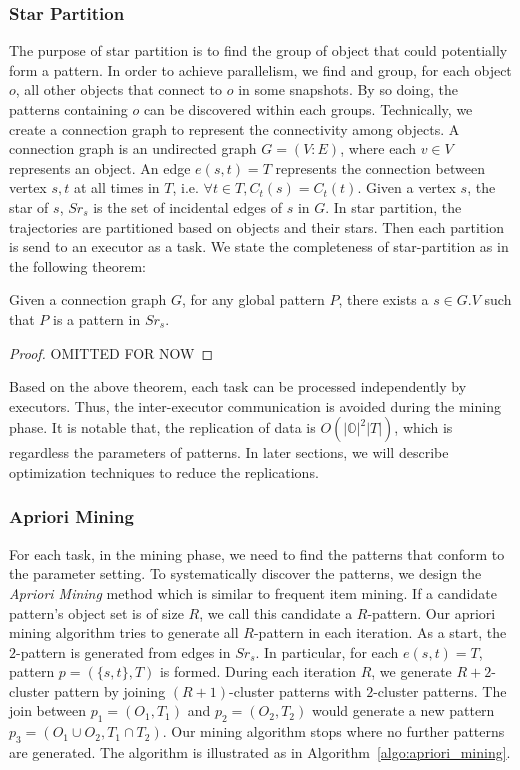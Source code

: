 \subsubsection{Star Partition}
The purpose of star partition is to find the group of object that 
could potentially form a pattern. In order to achieve parallelism, 
we find and group, for each object $o$, all other objects that connect to $o$ in some
snapshots. By so doing, the patterns containing $o$ can be discovered within
each groups. Technically, we create a connection graph to represent the
connectivity among objects. A connection graph is an undirected graph $G=(V:E)$, where 
each $v \in V$ represents an object. An edge $e(s,t)= T$ 
represents the connection between vertex $s,t$ at all times in $T$, 
i.e. $\forall t \in T, C_t(s) = C_t(t)$. 
Given a vertex $s$, the star of $s$, $Sr_s$ is the set of incidental edges of $s$ in $G$.
In star partition, the trajectories are partitioned based on objects and their stars. Then
each partition is send to an executor as a task.
We state the completeness of star-partition as in the following theorem:
\begin{theorem}
Given a connection graph $G$, for any global pattern $P$, there exists a $s \in G.V$ such 
that $P$ is a pattern in $Sr_s$.
\end{theorem}

\begin{proof}
OMITTED FOR NOW
\end{proof}

Based on the above theorem, each task can be processed independently by executors. 
Thus, the inter-executor communication is avoided during the mining phase. It is notable that, the 
replication of data is $O(|\mathbb{O}|^2|T|)$, which is regardless the parameters of patterns.
In later sections, we will describe optimization techniques to reduce the replications.

\subsubsection{Apriori Mining}
For each task, in the mining phase, we need to find the patterns that conform to the parameter
setting. To systematically discover the patterns, we design the \emph{Apriori Mining} method which
is similar to frequent item mining. If a candidate pattern's object set is of size $R$, we call
this candidate a $R$-pattern. Our apriori mining algorithm tries to generate all $R$-pattern in
each iteration. As a start, the $2$-pattern is generated from edges in $Sr_s$. In particular,
for each $e(s,t)=T$, pattern $p=(\{s,t\}, T)$ is formed. During each iteration $R$, 
we generate $R+2$-cluster pattern by joining $(R+1)$-cluster patterns with $2$-cluster patterns. 
The join between $p_1=(O_1, T_1)$ and $p_2=(O_2, T_2)$ would generate a new pattern $p_3=(O_1 \cup O_2, T_1 \cap T_2)$.
Our mining algorithm stops where no further patterns are generated. The algorithm is illustrated as in Algorithm~\ref{algo:apriori_mining}.

